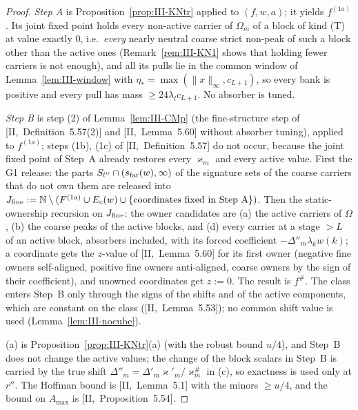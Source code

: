 \documentclass[10pt]{amsart}
\theoremstyle{definition}
\theoremstyle{remark}
\newcommand{\N}{\mathbb N}
\begin{document}
\begin{proof}
\emph{Step A} is Proposition~\ref{prop:III-KNtr} applied to $(f,w,a)$; it
yields $f^{(1a)}$.  Its joint fixed point holds every non-active carrier of
$\Omega_m$ of a block of kind (T) at value exactly $0$, i.e.\ \emph{every}
nearly neutral coarse strict non-peak of such a block other than the active
ones (Remark~\ref{rem:III-KN1} shows that holding fewer carriers is not
enough), and all its pulls lie in the common window of
Lemma~\ref{lem:III-window} with $\eta_*=\max(\|x\|_\infty,c_{L+1})$, so every
bank is positive and every pull has mass $\ge24\lambda_lc_{L+1}$.  No absorber
is tuned.

\emph{Step B} is step (2) of Lemma~\ref{lem:III-CMp} (the fine-structure step
of [II,~Definition~5.57(2)] and [II,~Lemma~5.60] without absorber tuning),
applied to $f^{(1a)}$; steps (1b), (1c) of [II,~Definition~5.57] do not occur,
because the joint fixed point of Step~A already restores every $\varkappa_m$ and
every active value.  First the G1 release: the parts
$S_{l''}\cap(s_{\rm far}(w),\infty)$ of the signature sets of the coarse carriers
that do not own them are released into $J_{\rm fine}:=\N\setminus(F^{(1a)}\cup
E_c(w)\cup\{\text{coordinates fixed in Step A}\})$.  Then the static-ownership
recursion on $J_{\rm fine}$: the owner candidates are (a) the active carriers
of $\Omega$, (b) the coarse peaks of the active blocks, and (d) every carrier
at a stage $>L$ of an active block, absorbers included, with its forced
coefficient $-\Delta''_m\lambda_kw(k)$; a coordinate gets the $z$-value of
[II,~Lemma~5.60] for its first owner (negative fine owners self-aligned,
positive fine owners anti-aligned, coarse owners by the sign of their
coefficient), and unowned coordinates get $z:=0$.  The result is $f^\#$.  The
class enters Step~B only through the signs of the shifts and of the active
components, which are constant on the class ([II,~Lemma~5.53]); no common
shift value is used (Lemma~\ref{lem:III-nocube}).

(a) is Proposition~\ref{prop:III-KNtr}(a) (with the robust bound $u/4$), and
Step~B does not change the active values; the change of the block scalars
in Step~B is carried by the true shift $\Delta''_m=\Delta'_m\varkappa'_m/
\varkappa^\#_m$ in (c), so exactness is used only at $r''$.  The Hoffman bound is
[II,~Lemma~5.1] with the minors $\ge u/4$, and the bound on $A_{\max}$ is
[II,~Proposition~5.54].


\end{proof}
\end{document}
